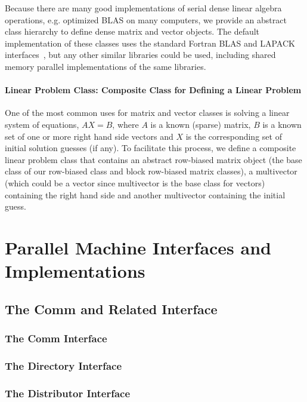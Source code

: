 \documentclass[12pt,relax]{PetraObjectModel}
\begin{document}
Because there are many good implementations of serial dense linear algebra operations, 
e.g. optimized BLAS on many computers, we provide an abstract class hierarchy to define 
dense matrix and vector objects.  The default implementation of these classes uses the 
standard Fortran BLAS and LAPACK interfaces~\cite{BLAS1,BLAS2,BLAS3,LAPACK}, 
but any other similar libraries could be 
used, including shared memory parallel implementations of the same libraries.

\paragraph{Linear Problem Class:  Composite Class for Defining a Linear Problem}

One of the most common uses for matrix and vector classes is solving a linear system of 
equations, $AX = B$, where $A$ is a known (sparse) matrix, $B$ is a known set of one or 
more right hand side vectors and $X$ is the corresponding set of initial solution 
guesses (if any).  To facilitate this process, we define a composite linear problem 
class that contains an abstract row-biased matrix object (the base class of our 
row-biased class and block row-biased matrix classes), a multivector (which could be a 
vector since multivector is the base class for vectors) containing the right hand side 
and another multivector containing the initial guess.

\section{Parallel Machine Interfaces and Implementations}

\subsection{The Comm and Related Interface}

\subsubsection{The Comm Interface}
\subsubsection{The Directory Interface}
\subsubsection{The Distributor Interface}
\end{document}
